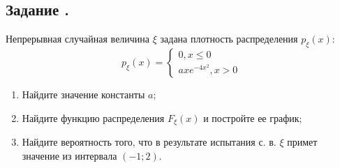 \documentclass[12pt]{article}
\begin{document}
\subsection{Задание .}
Непрерывная случайная величина $\xi$ задана плотность распределения $p_{\xi}(x)$:
\[
	p_{\xi}(x) =
	\begin{cases}
		0, x \leq 0 \\
		axe^{-4x^2}, x > 0
	\end{cases}
\]
\begin{enumerate}
	\item Найдите значение константы $a$;
	\item Найдите функцию распределения $F_{\xi}(x)$ и постройте ее график;
	\item Найдите вероятность того, что в результате испытания с. в. $\xi$ примет значение из интервала $(-1; 2)$.
\end{enumerate}
\end{document}
